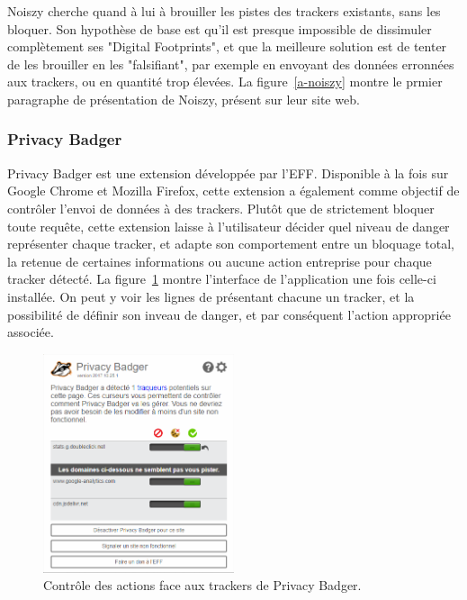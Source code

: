 			Noiszy cherche quand à lui à brouiller les pistes des trackers existants, sans les bloquer. Son hypothèse de base est qu'il est presque impossible de dissimuler complètement ses "Digital Footprints", et que la meilleure solution est de tenter de les brouiller en les "falsifiant", par exemple en envoyant des données erronnées aux trackers, ou en quantité trop élevées.
			La figure~\ref{a-noiszy} montre le prmier paragraphe de présentation de Noiszy, présent sur leur site web.

		\subsubsection{Privacy Badger}

			Privacy Badger est une extension développée par l'EFF\cite{eff}. Disponible à la fois sur Google Chrome et Mozilla Firefox, cette extension a également comme objectif de contrôler l'envoi de données à des trackers.
			Plutôt que de strictement bloquer toute requête, cette extension laisse à l'utilisateur décider quel niveau de danger représenter chaque tracker, et adapte son comportement entre un bloquage total, la retenue de certaines informations ou aucune action entreprise pour chaque tracker détecté.
			La figure~\ref{a-privacybadger} montre l'interface de l'application une fois celle-ci installée. On peut y voir les lignes de présentant chacune un tracker, et la possibilité de définir son inveau de danger, et par conséquent l'action appropriée associée.

			\begin{figure}[h]
				\centering
				\includegraphics[width=0.5\textwidth]{images/analysis/privacybadger}
				\caption{Contrôle des actions face aux trackers de Privacy Badger\cite{privacybadger}.}
				\label{a-privacybadger}
			\end{figure}

